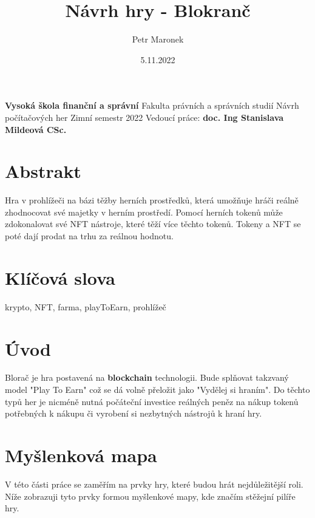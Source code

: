 \documentclass{article}
\title{Návrh hry - Blokranč}
\author{Petr Maronek}
\date{5.11.2022}
\begin{document}
	\begin{spacing}{1.15}
		\rmfamily
		\maketitle
		\begin{center}
			\textbf{Vysoká škola finanční a správní}\linebreak
			Fakulta právních a správních studií\linebreak
			Návrh počítačových her\linebreak
			Zimní semestr 2022\linebreak
			Vedoucí práce: \textbf{doc. Ing Stanislava Mildeová CSc.}
		\end{center}
		\pagebreak
			
		\section*{Abstrakt}
		Hra v prohlížeči na bázi těžby herních prostředků, která umožňuje hráči reálně zhodnocovat své majetky v herním prostředí. Pomocí herních tokenů může zdokonalovat své NFT nástroje, které těží více těchto tokenů. Tokeny a NFT se poté dají prodat na trhu za reálnou hodnotu.
				
		\section*{Klíčová slova}
		krypto, NFT, farma, playToEarn, prohlížeč
		\pagebreak
		    
		\section*{Úvod}
		Blorač je hra postavená na \textbf{blockchain} technologii. Bude splňovat takzvaný model "Play To Earn" což se dá volně přeložit jako "Vydělej si hraním". Do těchto typů her je nicméně nutná počáteční investice reálných peněz na nákup tokenů potřebných k nákupu či vyrobení si nezbytných nástrojů k hraní hry. 
		
		\section*{Myšlenková mapa}
		V této části práce se zaměřím na prvky hry, které budou hrát nejdůležitější roli. Níže zobrazuji tyto prvky formou myšlenkové mapy, kde značím stěžejní pilíře hry.
		

\end{spacing}
\end{document}
